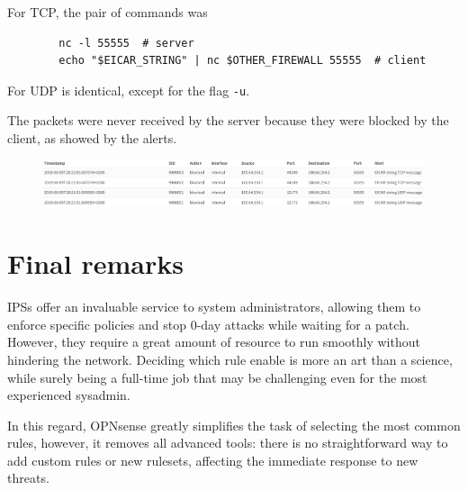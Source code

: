\documentclass[draft]{homework}
\newcommand{\opn}{OPNsense\xspace}
\begin{document}
    For TCP, the pair of commands was
    \begin{verbatim}
        nc -l 55555  # server
        echo "$EICAR_STRING" | nc $OTHER_FIREWALL 55555  # client
    \end{verbatim}
    For UDP is identical, except for the flag \texttt{-u}.
    
    The packets were never received by the server because they were blocked by the client, as showed by the alerts.
    \begin{figure}[H]
        \centering
        \includegraphics[width=\linewidth]{images/proof}
        \label{fig:proof}
    \end{figure}
    
    
    \section{Final remarks}
    IPSs offer an invaluable service to system administrators, allowing them to enforce specific policies and stop 0-day attacks while waiting for a patch.
    However, they require a great amount of resource to run smoothly without hindering the network.
    Deciding which rule enable is more an art than a science, while surely being a full-time job that may be challenging even for the most experienced sysadmin.
    
    In this regard, \opn greatly simplifies the task of selecting the most common rules, however, it removes all advanced tools: there is no straightforward way to add custom rules or new rulesets, affecting the immediate response to new threats.
\end{document}
